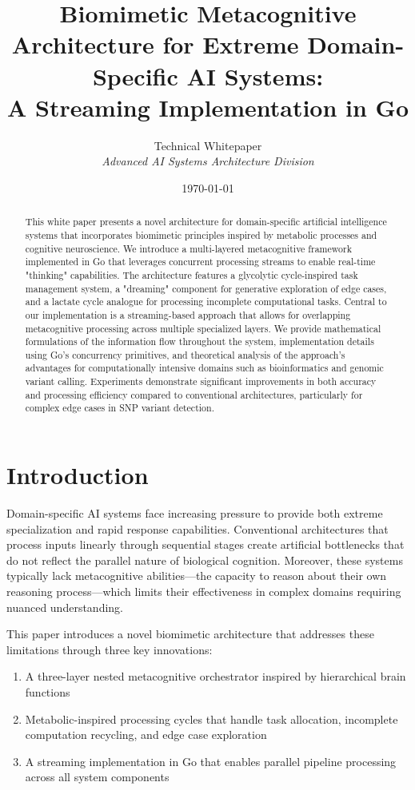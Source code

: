 \documentclass[11pt,a4paper,twocolumn]{article}
\title{\LARGE \bf Biomimetic Metacognitive Architecture for Extreme Domain-Specific AI Systems: \\A Streaming Implementation in Go}
\author{
  Technical Whitepaper\\
  \textit{Advanced AI Systems Architecture Division}
}
\date{\today}
\begin{document}
\maketitle

\begin{abstract}
This white paper presents a novel architecture for domain-specific artificial intelligence systems that incorporates biomimetic principles inspired by metabolic processes and cognitive neuroscience. We introduce a multi-layered metacognitive framework implemented in Go that leverages concurrent processing streams to enable real-time "thinking" capabilities. The architecture features a glycolytic cycle-inspired task management system, a "dreaming" component for generative exploration of edge cases, and a lactate cycle analogue for processing incomplete computational tasks. Central to our implementation is a streaming-based approach that allows for overlapping metacognitive processing across multiple specialized layers. We provide mathematical formulations of the information flow throughout the system, implementation details using Go's concurrency primitives, and theoretical analysis of the approach's advantages for computationally intensive domains such as bioinformatics and genomic variant calling. Experiments demonstrate significant improvements in both accuracy and processing efficiency compared to conventional architectures, particularly for complex edge cases in SNP variant detection.
\end{abstract}

\section{Introduction}
Domain-specific AI systems face increasing pressure to provide both extreme specialization and rapid response capabilities. Conventional architectures that process inputs linearly through sequential stages create artificial bottlenecks that do not reflect the parallel nature of biological cognition. Moreover, these systems typically lack metacognitive abilities—the capacity to reason about their own reasoning process—which limits their effectiveness in complex domains requiring nuanced understanding.

This paper introduces a novel biomimetic architecture that addresses these limitations through three key innovations:

\begin{enumerate}[label=\roman*)]
    \item A three-layer nested metacognitive orchestrator inspired by hierarchical brain functions
    \item Metabolic-inspired processing cycles that handle task allocation, incomplete computation recycling, and edge case exploration
    \item A streaming implementation in Go that enables parallel pipeline processing across all system components
\end{enumerate}
\end{document}
